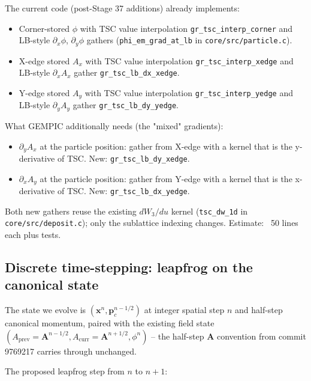 \documentclass[11pt,a4paper]{article}
\newcommand{\vv}[1]{\mathbf{#1}}
\begin{document}
The current code (post-Stage 37 additions) already implements:
\begin{itemize}
  \item Corner-stored $\phi$ with TSC value interpolation
    \texttt{gr\_tsc\_interp\_corner} and LB-style $\partial_x \phi$,
    $\partial_y \phi$ gathers
    (\texttt{phi\_em\_grad\_at\_lb} in \texttt{core/src/particle.c}).
  \item X-edge stored $A_x$ with TSC value interpolation
    \texttt{gr\_tsc\_interp\_xedge} and LB-style $\partial_x A_x$
    gather \texttt{gr\_tsc\_lb\_dx\_xedge}.
  \item Y-edge stored $A_y$ with TSC value interpolation
    \texttt{gr\_tsc\_interp\_yedge} and LB-style $\partial_y A_y$
    gather \texttt{gr\_tsc\_lb\_dy\_yedge}.
\end{itemize}
What GEMPIC additionally needs (the "mixed" gradients):
\begin{itemize}
  \item $\partial_y A_x$ at the particle position: gather from
    X-edge with a kernel that is the y-derivative of TSC.
    New: \texttt{gr\_tsc\_lb\_dy\_xedge}.
  \item $\partial_x A_y$ at the particle position: gather from
    Y-edge with a kernel that is the x-derivative of TSC.
    New: \texttt{gr\_tsc\_lb\_dx\_yedge}.
\end{itemize}
Both new gathers reuse the existing $dW_3/du$ kernel
(\texttt{tsc\_dw\_1d} in \texttt{core/src/deposit.c}); only the
sublattice indexing changes.  Estimate: ~50 lines each plus tests.

\subsection{Discrete time-stepping: leapfrog on the canonical state}

The state we evolve is $(\vv{x}^n, \vv{p}_c^{n-1/2})$ at integer
spatial step $n$ and half-step canonical momentum, paired with the
existing field state $(A_{\mathrm{prev}} = \vv{A}^{n-1/2},
A_{\mathrm{curr}} = \vv{A}^{n+1/2}, \phi^n)$ -- the half-step
$\vv{A}$ convention from commit 9769217 carries through unchanged.

The proposed leapfrog step from $n$ to $n+1$:
\end{document}
